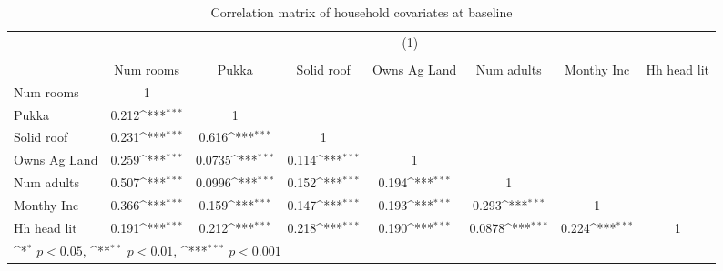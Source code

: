 \begin{table}[htbp]\centering
\def\sym#1{\ifmmode^{#1}\else\(^{#1}\)\fi}
\caption{Correlation matrix of household covariates at baseline}
\begin{tabular}{l*{7}{c}}
\hline\hline
                &\multicolumn{7}{c}{(1)}                                                                                                             \\
                &\multicolumn{7}{c}{}                                                                                                                \\
                &Num rooms         &    Pukka         &Solid roof         &Owns Ag Land         &Num adults         &Monthy Inc         &Hh head lit         \\
\hline
Num rooms       &        1         &                  &                  &                  &                  &                  &                  \\
Pukka           &    0.212\sym{***}&        1         &                  &                  &                  &                  &                  \\
Solid roof      &    0.231\sym{***}&    0.616\sym{***}&        1         &                  &                  &                  &                  \\
Owns Ag Land    &    0.259\sym{***}&   0.0735\sym{***}&    0.114\sym{***}&        1         &                  &                  &                  \\
Num adults      &    0.507\sym{***}&   0.0996\sym{***}&    0.152\sym{***}&    0.194\sym{***}&        1         &                  &                  \\
Monthy Inc      &    0.366\sym{***}&    0.159\sym{***}&    0.147\sym{***}&    0.193\sym{***}&    0.293\sym{***}&        1         &                  \\
Hh head lit     &    0.191\sym{***}&    0.212\sym{***}&    0.218\sym{***}&    0.190\sym{***}&   0.0878\sym{***}&    0.224\sym{***}&        1         \\
\hline\hline
\multicolumn{8}{l}{\footnotesize \sym{*} \(p<0.05\), \sym{**} \(p<0.01\), \sym{***} \(p<0.001\)}\\
\end{tabular}
\end{table}
